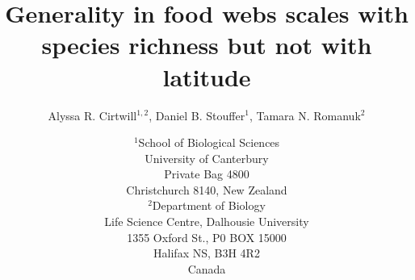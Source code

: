 \documentclass[12pt]{article}
\begin{document}
\title{Generality in food webs scales with species richness but not with latitude}
\author{Alyssa R. Cirtwill$^{1,2}$, Daniel B. Stouffer$^{1}$, Tamara N. Romanuk$^{2}$}
\date{$^1$School of Biological Sciences\\University of Canterbury\\
Private Bag 4800\\Christchurch 8140, New Zealand \\
\medskip$^2$Department of Biology\\
Life Science Centre, Dalhousie University\\1355 Oxford St., P0 BOX 15000\\
Halifax NS, B3H 4R2\\ Canada\\}

\maketitle
\baselineskip=8.5mm
 
\vspace{0.3 in}
\end{document}
